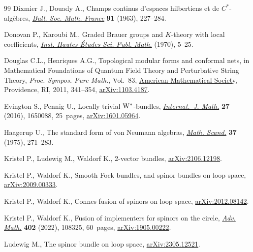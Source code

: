 \begin{thebibliography}{99}
Dixmier J., Douady A., Champs continus d'espaces hilbertiens et de
 {$C^*$}-alg\`ebres, \href{https://doi.org/10.24033/bsmf.1596}{\textit{Bull. Soc. Math. France}} \textbf{91} (1963),
 227--284.

Donovan P., Karoubi M., Graded {B}rauer groups and {$K$}-theory with local
 coefficients,  \href{https://doi.org/10.24033/bsmf.1596}{\textit{Inst. Hautes \'Etudes Sci. Publ. Math.}} (1970), 5--25.

Douglas C.L., Henriques A.G., Topological modular forms and conformal nets, in
 Mathematical {F}oundations of {Q}uantum {F}ield {T}heory and {P}erturbative
 {S}tring {T}heory, \textit{Proc. Sympos. Pure Math.}, Vol.~83,  \href{https://doi.org/10.1090/pspum/083/2742433}{American
 Mathematical Society}, Providence, RI, 2011, 341--354, \href{https://arxiv.org/abs/1103.4187}{arXiv:1103.4187}.

Evington S., Pennig U., Locally trivial {${\rm W}^*$}-bundles,
 \href{https://doi.org/10.1142/S0129167X16500889}{\textit{Internat.~J. Math.}} \textbf{27} (2016), 1650088, 25~pages,
 \href{https://arxiv.org/abs/1601.05964}{arXiv:1601.05964}.

Haagerup U., The standard form of von {N}eumann algebras,  \href{https://doi.org/10.7146/math.scand.a-11606}{\textit{Math. Scand.}}
 \textbf{37} (1975), 271--283.

Kristel P., Ludewig M., Waldorf K., 2-vector bundles, \href{https://arxiv.org/abs/2106.12198}{arXiv:2106.12198}.

Kristel P., Waldorf K., Smooth {F}ock bundles, and spinor bundles on loop
 space, \href{https://arxiv.org/abs/2009.00333}{arXiv:2009.00333}.

Kristel P., Waldorf K., Connes fusion of spinors on loop space,
 \href{https://arxiv.org/abs/2012.08142}{arXiv:2012.08142}.

Kristel P., Waldorf K., Fusion of implementers for spinors on the circle,
 \href{https://doi.org/10.1016/j.aim.2022.108325}{\textit{Adv. Math.}} \textbf{402} (2022), 108325, 60~pages,
 \href{https://arxiv.org/abs/1905.00222}{arXiv:1905.00222}.

Ludewig M., The spinor bundle on loop space, \href{https://arxiv.org/abs/2305.12521}{arXiv:2305.12521}.


\end{thebibliography}
